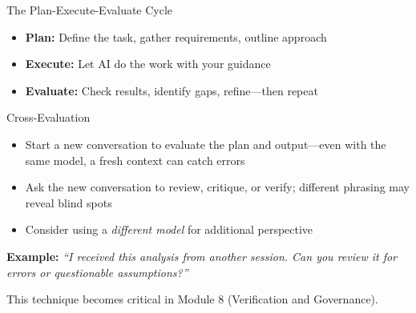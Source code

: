 \documentclass[aspectratio=169]{beamer}
\begin{document}
\begin{frame}{The Plan-Execute-Evaluate Cycle}
\begin{center}
\end{center}

\begin{itemize}
  \item \textbf{Plan:} Define the task, gather requirements, outline approach
  \item \textbf{Execute:} Let AI do the work with your guidance
  \item \textbf{Evaluate:} Check results, identify gaps, refine---then repeat
\end{itemize}
\end{frame}

\begin{frame}{Cross-Evaluation}
\begin{itemize}
  \item Start a \alert{new conversation} to evaluate the plan and output---even with the same model, a fresh context can catch errors
  \item Ask the new conversation to review, critique, or verify; different phrasing may reveal blind spots
  \item Consider using a \textit{different model} for additional perspective
\end{itemize}

\vspace{0.3cm}
\textbf{Example:} \textit{``I received this analysis from another session. Can you review it for errors or questionable assumptions?''}

\vspace{0.3cm}
This technique becomes critical in Module 8 (Verification and Governance).
\end{frame}
\end{document}
